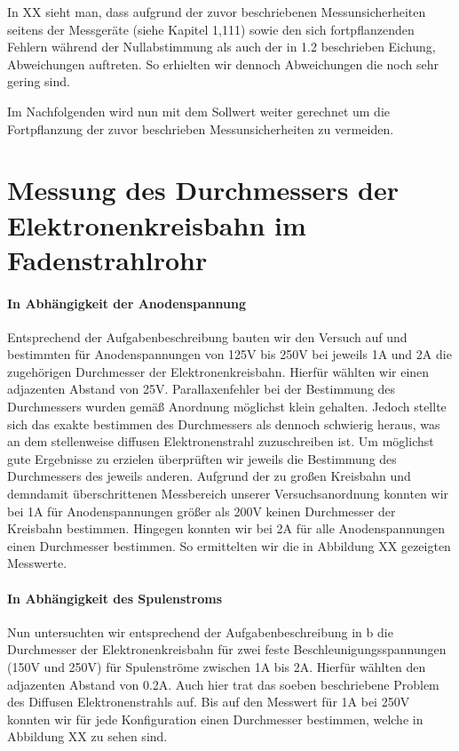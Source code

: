  In XX sieht man, dass aufgrund der zuvor beschriebenen Messunsicherheiten seitens der Messgeräte (siehe Kapitel 1,111) sowie den sich fortpflanzenden Fehlern während der Nullabstimmung als auch der in 1.2 beschrieben Eichung, Abweichungen auftreten. So erhielten wir dennoch Abweichungen die noch sehr gering sind.
 
 Im Nachfolgenden wird nun mit dem Sollwert weiter gerechnet um die Fortpflanzung der zuvor beschrieben Messunsicherheiten zu vermeiden.
 
 
\section{Messung des Durchmessers der Elektronenkreisbahn im Fadenstrahlrohr}
\label{MessungDurchmesser}
\paragraph{In Abhängigkeit der Anodenspannung}
\label{AbhaengigkeitAnodenspannung}
Entsprechend der Aufgabenbeschreibung bauten wir den Versuch auf und bestimmten für Anodenspannungen von 125V bis 250V bei jeweils 1A und 2A die zugehörigen Durchmesser der Elektronenkreisbahn. Hierfür wählten wir einen adjazenten Abstand von 25V. Parallaxenfehler bei der Bestimmung des Durchmessers wurden gemäß Anordnung möglichst klein gehalten. Jedoch stellte sich das exakte bestimmen des Durchmessers als dennoch schwierig heraus, was an dem stellenweise diffusen Elektronenstrahl zuzuschreiben ist. Um möglichst gute Ergebnisse zu erzielen überprüften wir jeweils die Bestimmung des Durchmessers des jeweils anderen. Aufgrund der zu großen Kreisbahn und demndamit überschrittenen Messbereich unserer Versuchsanordnung konnten wir bei 1A für Anodenspannungen größer als 200V keinen Durchmesser der Kreisbahn bestimmen. Hingegen konnten wir bei 2A für alle Anodenspannungen einen Durchmesser bestimmen. So ermittelten wir die in Abbildung XX gezeigten Messwerte. 




\paragraph{In Abhängigkeit des Spulenstroms}
\label{AbhaengigkeitSpulenstroms}
Nun untersuchten wir entsprechend der Aufgabenbeschreibung in b die  Durchmesser der Elektronenkreisbahn für zwei feste Beschleunigungsspannungen (150V und 250V) für Spulenströme zwischen 1A bis 2A. Hierfür wählten den adjazenten Abstand von 0.2A. Auch hier trat das soeben beschriebene Problem des Diffusen Elektronenstrahls auf. Bis auf den Messwert für 1A bei 250V konnten wir für jede Konfiguration einen Durchmesser bestimmen, welche in Abbildung XX zu sehen sind.






